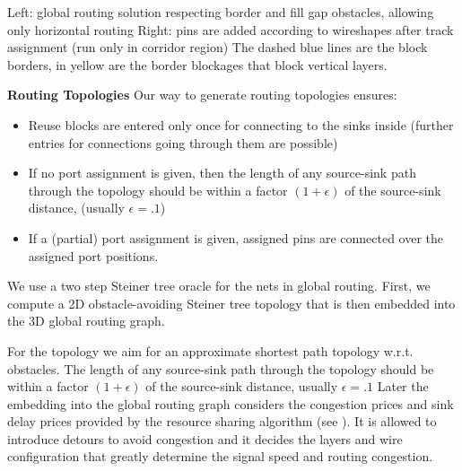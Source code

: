 \documentclass[a2paper]{bigsposter}
\begin{document}
\begin{blockrow}[3]
 {\footnotesize \begin{spacing}{0.9}
 		Left: global routing solution respecting border and fill gap obstacles, allowing only horizontal routing
 		Right: pins are added according to wireshapes after track assignment (run only in corridor region)
 		The dashed blue lines are the block borders, in yellow are the border blockages that block vertical layers.
 	\end{spacing}	}
 
 	
	\blockbreak
	\textbf{Routing Topologies}
	Our way to generate routing topologies ensures:
	\begin{itemize}
		\item Reuse blocks are entered only once for connecting to the sinks inside (further entries for connections going through them are possible)
		\item If no port assignment is given, then the length of any source-sink path through the topology
		should be within a factor $(1+\epsilon)$ of the source-sink distance, (usually $\epsilon=.1$)
		\item If a (partial) port assignment is given, assigned pins are connected over the assigned port positions.
	\end{itemize}
	We use a two step Steiner tree oracle for the nets in  global routing.
	First, we compute a 2D obstacle-avoiding Steiner tree topology  that is then embedded into the 3D global routing graph.
	
	
	For the topology  we aim  for an approximate shortest path topology w.r.t. obstacles. The length of any source-sink path through the topology
	should be within a factor $(1+\epsilon)$ of the source-sink distance, usually $\epsilon=.1$ 
	Later the embedding into the global routing graph considers the congestion prices and sink delay prices provided by the resource sharing algorithm (see \cite{BRGTiming2}).
	It is allowed to  introduce detours to avoid congestion and it decides the  layers and wire configuration that greatly determine the signal speed and routing congestion.
	

\end{blockrow}
\end{document}

